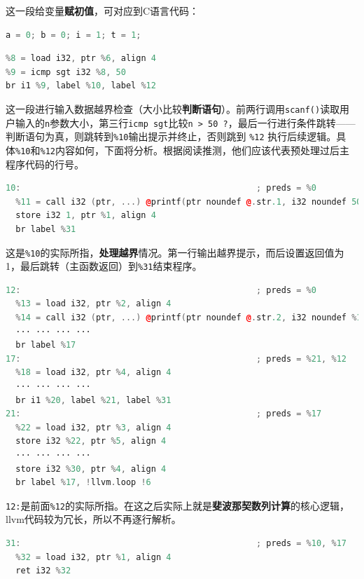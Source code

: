 \documentclass[UTF8,a4paper,10pt]{ctexart}
\begin{document}
这一段给变量\textbf{赋初值}，可对应到C语言代码：
\begin{lstlisting}[frame=trbl,language={C}]
a = 0; b = 0; i = 1; t = 1;
\end{lstlisting}


\begin{lstlisting}[title=main.ll 段落 6,frame=trbl,language={C++}]
%7 = call i32 (ptr, ...) @__isoc99_scanf(ptr noundef @.str, ptr noundef %6)
%8 = load i32, ptr %6, align 4
%9 = icmp sgt i32 %8, 50
br i1 %9, label %10, label %12
\end{lstlisting}

这一段进行输入数据越界检查（大小比较\textbf{判断语句}）。前两行调用\texttt{scanf()}读取用户输入的\texttt{n}参数大小，第三行\texttt{icmp sgt}比较\texttt{n > 50 ?}，最后一行进行条件跳转——判断语句为真，则跳转到\texttt{\%10}输出提示并终止，否则跳到 \texttt{\%12} 执行后续逻辑。具体\texttt{\%10}和\texttt{\%12}内容如何，下面将分析。根据阅读推测，他们应该代表预处理过后主程序代码的行号。


\begin{lstlisting}[title=main.ll 段落 7,frame=trbl,language={C++}]
10:                                               ; preds = %0
  %11 = call i32 (ptr, ...) @printf(ptr noundef @.str.1, i32 noundef 50)
  store i32 1, ptr %1, align 4
  br label %31
\end{lstlisting}

这是\texttt{\%10}的实际所指，\textbf{处理越界}情况。第一行输出越界提示，而后设置返回值为1，最后跳转（主函数返回）到\texttt{\%31}结束程序。

\begin{lstlisting}[title=main.ll 段落 8,frame=trbl,language={C++}]
12:                                               ; preds = %0
  %13 = load i32, ptr %2, align 4
  %14 = call i32 (ptr, ...) @printf(ptr noundef @.str.2, i32 noundef %13)
  ··· ··· ··· ···
  br label %17
17:                                               ; preds = %21, %12
  %18 = load i32, ptr %4, align 4
  ··· ··· ··· ···
  br i1 %20, label %21, label %31
21:                                               ; preds = %17
  %22 = load i32, ptr %3, align 4
  store i32 %22, ptr %5, align 4
  ··· ··· ··· ···
  store i32 %30, ptr %4, align 4
  br label %17, !llvm.loop !6
\end{lstlisting}

\texttt{12:}是前面\texttt{\%12}的实际所指。在这之后实际上就是\textbf{斐波那契数列计算}的核心逻辑，llvm代码较为冗长，所以不再逐行解析。

\begin{lstlisting}[title=main.ll 段落 9,frame=trbl,language={C++}]
31:                                               ; preds = %10, %17
  %32 = load i32, ptr %1, align 4
  ret i32 %32
\end{lstlisting}
\end{document}
